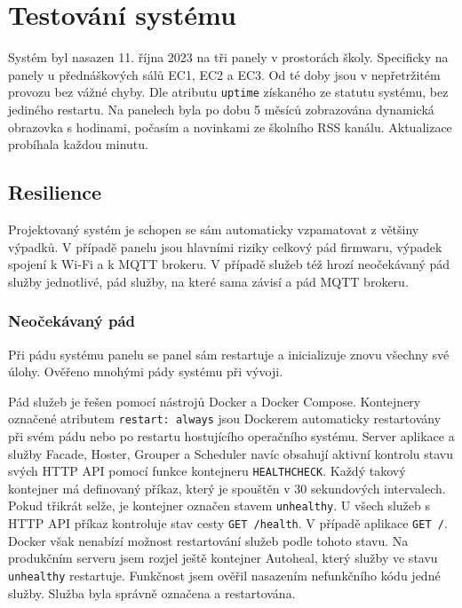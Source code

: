 \chapter{Testování systému}
Systém byl nasazen 11. října 2023 na tři panely v prostorách školy. Specificky na panely u přednáškových sálů EC1, EC2 a EC3. Od té doby jsou v nepřetržitém provozu bez vážné chyby. Dle atributu \lstinline|uptime| získaného ze statutu systému, bez jediného restartu. Na panelech byla po dobu 5 měsíců zobrazována dynamická obrazovka s hodinami, počasím a novinkami ze školního RSS kanálu. Aktualizace probíhala každou minutu.

\section{Resilience}
Projektovaný systém je schopen se sám automaticky vzpamatovat z většiny výpadků. V případě panelu jsou hlavními riziky celkový pád firmwaru, výpadek spojení k Wi-Fi a k MQTT brokeru. V případě služeb též hrozí neočekávaný pád služby jednotlivé, pád služby, na které sama závisí a pád MQTT brokeru.

\subsection{Neočekávaný pád}
Při pádu systému panelu se panel sám restartuje a inicializuje znovu všechny své úlohy. Ověřeno mnohými pády systému při vývoji.

Pád služeb je řešen pomocí nástrojů Docker a Docker Compose. Kontejnery označené atributem \lstinline|restart: always| jsou Dockerem automaticky restartovány při svém pádu nebo po restartu hostujícího operačního systému. Server aplikace a služby Facade, Hoster, Grouper a Scheduler navíc obsahují aktivní kontrolu stavu svých HTTP API pomocí funkce kontejneru \lstinline|HEALTHCHECK|. Každý takový kontejner má definovaný příkaz, který je spouštěn v 30 sekundových intervalech. Pokud třikrát selže, je kontejner označen stavem \lstinline|unhealthy|. U všech služeb s HTTP API příkaz kontroluje stav cesty \lstinline|GET /health|. V případě aplikace \lstinline|GET /|. Docker však nenabízí možnost restartování služeb podle tohoto stavu\cite{AddSupportUserdefined}. Na produkčním serveru jsem rozjel ještě kontejner Autoheal\cite{farrellWillfarrellDockerautoheal2024}, který služby ve stavu \lstinline|unhealthy| restartuje. Funkčnost jsem ověřil nasazením nefunkčního kódu jedné služby. Služba byla správně označena a restartována.

